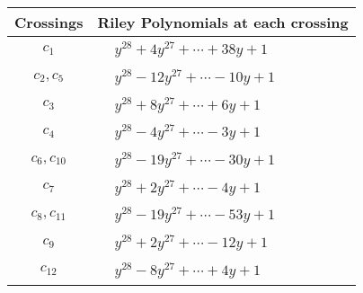 \documentclass[1p]{elsarticle_modified}
\theoremstyle{definition}
\begin{document}
\begin{tabular}{m{50pt}|m{274pt}}
Crossings & \hspace{64pt}Riley Polynomials at each crossing \\
\hline $$\begin{aligned}c_{1}\end{aligned}$$&$\begin{aligned}
&y^{28}+4 y^{27}+\cdots+38 y+1
\end{aligned}$\\
\hline $$\begin{aligned}c_{2},c_{5}\end{aligned}$$&$\begin{aligned}
&y^{28}-12 y^{27}+\cdots-10 y+1
\end{aligned}$\\
\hline $$\begin{aligned}c_{3}\end{aligned}$$&$\begin{aligned}
&y^{28}+8 y^{27}+\cdots+6 y+1
\end{aligned}$\\
\hline $$\begin{aligned}c_{4}\end{aligned}$$&$\begin{aligned}
&y^{28}-4 y^{27}+\cdots-3 y+1
\end{aligned}$\\
\hline $$\begin{aligned}c_{6},c_{10}\end{aligned}$$&$\begin{aligned}
&y^{28}-19 y^{27}+\cdots-30 y+1
\end{aligned}$\\
\hline $$\begin{aligned}c_{7}\end{aligned}$$&$\begin{aligned}
&y^{28}+2 y^{27}+\cdots-4 y+1
\end{aligned}$\\
\hline $$\begin{aligned}c_{8},c_{11}\end{aligned}$$&$\begin{aligned}
&y^{28}-19 y^{27}+\cdots-53 y+1
\end{aligned}$\\
\hline $$\begin{aligned}c_{9}\end{aligned}$$&$\begin{aligned}
&y^{28}+2 y^{27}+\cdots-12 y+1
\end{aligned}$\\
\hline $$\begin{aligned}c_{12}\end{aligned}$$&$\begin{aligned}
&y^{28}-8 y^{27}+\cdots+4 y+1
\end{aligned}$\\
\hline
\end{tabular}\\~\\
\end{document}
